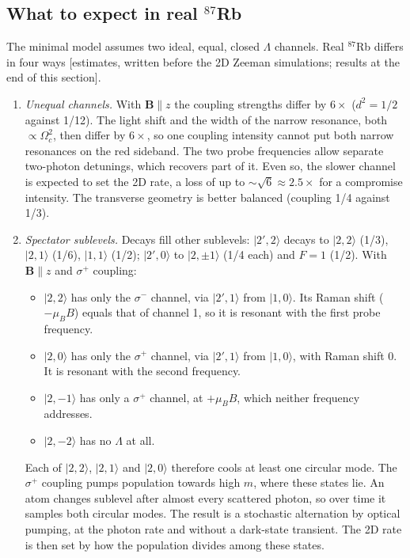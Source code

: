 \documentclass[11pt,a4paper]{article}
\newcommand{\ket}[1]{|#1\rangle}
\begin{document}
\subsection{What to expect in real $^{87}$Rb}
\label{sec:te01_zeeman}
The minimal model assumes two ideal, equal, closed $\Lambda$ channels. Real $^{87}$Rb differs in four ways [estimates, written before the 2D Zeeman simulations; results at the end of this section].
\begin{enumerate}
\item \emph{Unequal channels.} With $\bm B\parallel z$ the coupling strengths differ by $6\times$ ($d^2=1/2$ against 1/12). The light shift and the width of the narrow resonance, both $\propto\Omega_c^2$, then differ by $6\times$, so one coupling intensity cannot put both narrow resonances on the red sideband. The two probe frequencies allow separate two-photon detunings, which recovers part of it. Even so, the slower channel is expected to set the 2D rate, a loss of up to $\sim\sqrt6\approx2.5\times$ for a compromise intensity. The transverse geometry is better balanced (coupling 1/4 against 1/3).
\item \emph{Spectator sublevels.} Decays fill other sublevels: $\ket{2',2}$ decays to $\ket{2,2}$ (1/3), $\ket{2,1}$ (1/6), $\ket{1,1}$ (1/2); $\ket{2',0}$ to $\ket{2,\pm1}$ (1/4 each) and $F=1$ (1/2). With $\bm B\parallel z$ and $\sigma^+$ coupling:
  \begin{itemize}
  \item $\ket{2,2}$ has only the $\sigma^-$ channel, via $\ket{2',1}$ from $\ket{1,0}$. Its Raman shift ($-\mu_BB$) equals that of channel 1, so it is resonant with the first probe frequency.
  \item $\ket{2,0}$ has only the $\sigma^+$ channel, via $\ket{2',1}$ from $\ket{1,0}$, with Raman shift 0. It is resonant with the second frequency.
  \item $\ket{2,-1}$ has only a $\sigma^+$ channel, at $+\mu_BB$, which neither frequency addresses.
  \item $\ket{2,-2}$ has no $\Lambda$ at all.
  \end{itemize}
  Each of $\ket{2,2}$, $\ket{2,1}$ and $\ket{2,0}$ therefore cools at least one circular mode. The $\sigma^+$ coupling pumps population towards high $m$, where these states lie. An atom changes sublevel after almost every scattered photon, so over time it samples both circular modes. The result is a stochastic alternation by optical pumping, at the photon rate and without a dark-state transient. The 2D rate is then set by how the population divides among these states.

\end{enumerate}
\end{document}
